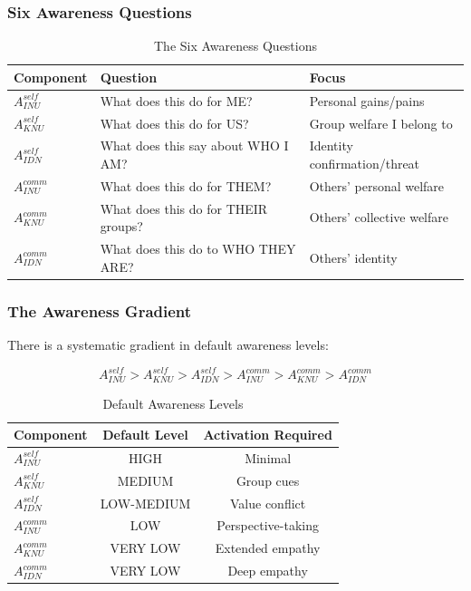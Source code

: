 \subsubsection{Six Awareness Questions}

\begin{table}[htbp]
\centering
\caption{The Six Awareness Questions}
\label{tab:six-questions}
\renewcommand{\arraystretch}{1.4}
\begin{tabular}{@{}lll@{}}
\toprule
\textbf{Component} & \textbf{Question} & \textbf{Focus} \\
\midrule
$A^{self}_{INU}$ & What does this do for ME? & Personal gains/pains \\
$A^{self}_{KNU}$ & What does this do for US? & Group welfare I belong to \\
$A^{self}_{IDN}$ & What does this say about WHO I AM? & Identity confirmation/threat \\
$A^{comm}_{INU}$ & What does this do for THEM? & Others' personal welfare \\
$A^{comm}_{KNU}$ & What does this do for THEIR groups? & Others' collective welfare \\
$A^{comm}_{IDN}$ & What does this do to WHO THEY ARE? & Others' identity \\
\bottomrule
\end{tabular}
\end{table}

\subsubsection{The Awareness Gradient}

There is a systematic gradient in default awareness levels:

\begin{equation}
A^{self}_{INU} > A^{self}_{KNU} > A^{self}_{IDN} > A^{comm}_{INU} > A^{comm}_{KNU} > A^{comm}_{IDN}
\end{equation}

\begin{table}[htbp]
\centering
\caption{Default Awareness Levels}
\label{tab:default-awareness}
\renewcommand{\arraystretch}{1.3}
\begin{tabular}{@{}lcc@{}}
\toprule
\textbf{Component} & \textbf{Default Level} & \textbf{Activation Required} \\
\midrule
$A^{self}_{INU}$ & HIGH & Minimal \\
$A^{self}_{KNU}$ & MEDIUM & Group cues \\
$A^{self}_{IDN}$ & LOW-MEDIUM & Value conflict \\
$A^{comm}_{INU}$ & LOW & Perspective-taking \\
$A^{comm}_{KNU}$ & VERY LOW & Extended empathy \\
$A^{comm}_{IDN}$ & VERY LOW & Deep empathy \\
\bottomrule
\end{tabular}
\end{table}

